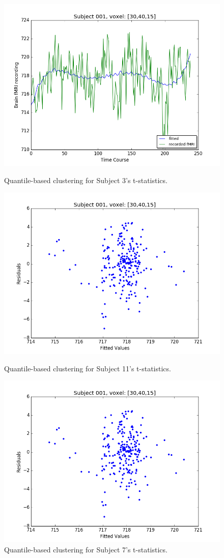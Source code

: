 \begin{figure}[ht]
\centering
\begin{minipage}[b]{0.45\linewidth}
	\centering
	\includegraphics[width=.8\linewidth]{../images/Fitted_v_Actual.png} 
	\caption{Quantile-based clustering for Subject 3's t-statistics.}
	\label{fig:clustersub3}
\end{minipage}	

\begin{minipage}[b]{0.45\linewidth}
	\centering
		\includegraphics[width=.8\linewidth]{../images/Fitted_v_Residuals.png} 
	\caption{Quantile-based clustering for Subject 11's t-statistics.}
	\label{fig:clustersub11}
\end{minipage}

\begin{minipage}[b]{0.45\linewidth}
	\centering
		\includegraphics[width=.8\linewidth]{../images/Fitted_v_Residuals.png} 
	\caption{Quantile-based clustering for Subject 7's t-statistics.}
	\label{fig:clustersub7}
\end{minipage}
\end{figure}




